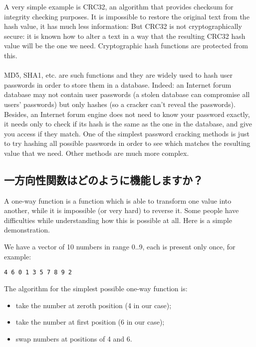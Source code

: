 ﻿\newcommand{\HashFuncChapterName}{Hash functions}
\mysection{\HashFuncChapterName}
\label{hash_func}

\myindex{\HashFuncChapterName}
A very simple example is CRC32, an algorithm that provides  checksum for integrity checking purposes.
It is impossible to restore the original text from the hash value, it has much less information:
But CRC32 is not cryptographically secure: it is known how to alter a text in a way that the resulting
CRC32 hash value will be the one we need.
Cryptographic hash functions are protected from this. \\
\\
MD5, SHA1, etc. are such functions and they are widely used to hash user passwords in order to store them in a database.
Indeed: an Internet forum database may not contain user passwords 
(a stolen database can compromise all users' passwords) but only hashes 
(so a cracker can't reveal the passwords).
Besides, an Internet forum engine does not need to know your password exactly, it needs only to check if its hash
is the same as the one in the database, and give you access if they match.
One of the simplest password cracking methods is just to try hashing all possible passwords in order
to see which matches the resulting value that we need.
Other methods are much more complex.

\subsection{一方向性関数はどのように機能しますか？}

A one-way function is a function which is able to transform one value into another,
while it is impossible (or very hard) to reverse it.
Some people have difficulties while understanding how this is possible at all.
Here is a simple demonstration.

We have a vector of 10 numbers in range 0..9, each is present only once, for example:

\begin{lstlisting}
4 6 0 1 3 5 7 8 9 2
\end{lstlisting}

The algorithm for the simplest possible one-way function is:

\begin{itemize}
\item take the number at zeroth position (4 in our case);
\item take the number at first position (6 in our case);
\item swap numbers at positions of 4 and 6.
\end{itemize}

